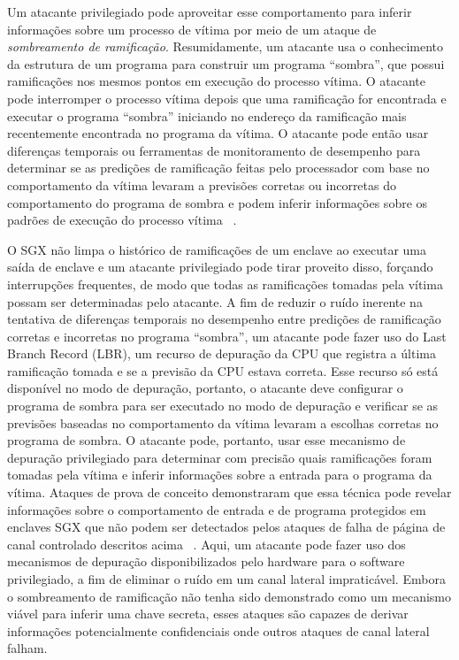 \documentclass[review]{elsarticle}
\begin{document}
Um atacante privilegiado pode aproveitar esse comportamento para inferir informações sobre um processo de vítima por meio de um ataque de \emph{sombreamento de ramificação}. Resumidamente, um atacante usa o conhecimento da estrutura de um programa para construir um programa ``sombra'', que possui ramificações nos mesmos pontos em execução do processo vítima. O atacante pode interromper o processo vítima depois que uma ramificação for encontrada e executar o programa ``sombra'' iniciando no endereço da ramificação mais recentemente encontrada no programa da vítima. O atacante pode então usar diferenças temporais ou ferramentas de monitoramento de desempenho para determinar se as predições de ramificação feitas pelo processador com base no comportamento da vítima levaram a previsões corretas ou incorretas do comportamento do programa de sombra e podem inferir informações sobre os padrões de execução do processo vítima ~\cite{lee_inferring_2017}.

O SGX não limpa o histórico de ramificações de um enclave ao executar uma saída de enclave e um atacante privilegiado pode tirar proveito disso, forçando interrupções frequentes, de modo que todas as ramificações tomadas pela vítima possam ser determinadas pelo atacante. A fim de reduzir o ruído inerente na tentativa de diferenças temporais no desempenho entre predições de ramificação corretas e incorretas no programa ``sombra'', um atacante pode fazer uso do Last Branch Record (LBR), um recurso de depuração da CPU que registra a última ramificação tomada e se a previsão da CPU estava correta. Esse recurso só está disponível no modo de depuração, portanto, o atacante deve configurar o programa de sombra para ser executado no modo de depuração e verificar se as previsões baseadas no comportamento da vítima levaram a escolhas corretas no programa de sombra. O atacante pode, portanto, usar esse mecanismo de depuração privilegiado para determinar com precisão quais ramificações foram tomadas pela vítima e inferir informações sobre a entrada para o programa da vítima. Ataques de prova de conceito demonstraram que essa técnica pode revelar informações sobre o comportamento de entrada e de programa protegidos em enclaves SGX que não podem ser detectados pelos ataques de falha de página de canal controlado descritos acima ~\cite{lee_inferring_2017, shinde_preventing_2015}. Aqui, um atacante pode fazer uso dos mecanismos de depuração disponibilizados pelo hardware para o software privilegiado, a fim de eliminar o ruído em um canal lateral impraticável. Embora o sombreamento de ramificação não tenha sido demonstrado como um mecanismo viável para inferir uma chave secreta, esses ataques são capazes de derivar informações potencialmente confidenciais onde outros ataques de canal lateral falham.
\end{document}
